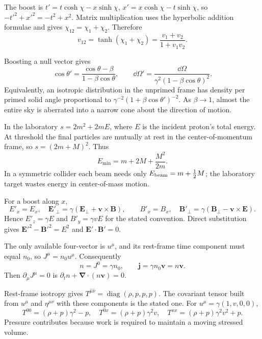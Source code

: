 \begin{solutions}

\begin{solution}
The boost is
\(t'=t\cosh\chi-x\sinh\chi\),
\(x'=x\cosh\chi-t\sinh\chi\), so
\(-t'^2+x'^2=-t^2+x^2\).  Matrix multiplication uses the hyperbolic addition
formulae and gives \(\chi_{12}=\chi_1+\chi_2\).  Therefore
\[
v_{12}=\tanh(\chi_1+\chi_2)
       =\frac{v_1+v_2}{1+v_1v_2}.
\]
\end{solution}

\begin{solution}
Boosting a null vector gives
\[
\cos\theta'=\frac{\cos\theta-\beta}{1-\beta\cos\theta},
\qquad
\dd\Omega'=\frac{\dd\Omega}{\gamma^2(1-\beta\cos\theta)^2}.
\]
Equivalently, an isotropic distribution in the unprimed frame has density per
primed solid angle proportional to
\(\gamma^{-2}(1+\beta\cos\theta')^{-2}\).  As \(\beta\to1\), almost the entire
sky is aberrated into a narrow cone about the direction of motion.
\end{solution}

\begin{solution}
In the laboratory \(s=2m^2+2mE\), where \(E\) is the incident proton's total
energy.  At threshold the final particles are mutually at rest in the
center-of-momentum frame, so \(s=(2m+M)^2\).  Thus
\[
E_{\min}=m+2M+\frac{M^2}{2m}.
\]
In a symmetric collider each beam needs only
\(E_{\rm beam}=m+\tfrac12M\); the laboratory target wastes energy in
center-of-mass motion.
\end{solution}

\begin{solution}
For a boost along \(x\),
\[
E'_x=E_x,\quad
\bm E'_\perp=\gamma(\bm E_\perp+\bm v\times\bm B),\qquad
B'_x=B_x,\quad
\bm B'_\perp=\gamma(\bm B_\perp-\bm v\times\bm E).
\]
Hence \(E'_z=\gamma E\) and \(B'_y=\gamma vE\) for the stated convention.
Direct substitution gives
\(\bm E'^2-\bm B'^2=E^2\) and
\(\bm E'\cdot\bm B'=0\).
\end{solution}

\begin{solution}
The only available four-vector is \(u^\mu\), and its rest-frame time component
must equal \(n_0\), so \(J^\mu=n_0u^\mu\).  Consequently
\[
n=J^0=\gamma n_0,\qquad \bm j=\gamma n_0\bm v=n\bm v.
\]
Then \(\partial_\mu J^\mu=0\) is
\(\partial_t n+\bm\nabla\cdot(n\bm v)=0\).
\end{solution}

\begin{solution}
Rest-frame isotropy gives
\(T^{\hat\mu\hat\nu}=\operatorname{diag}(\rho,p,p,p)\).  The covariant tensor
built from \(u^\mu\) and \(\eta^{\mu\nu}\) with these components is the stated
one.  For \(u^\mu=\gamma(1,v,0,0)\),
\[
T^{00}=(\rho+p)\gamma^2-p,\quad
T^{0x}=(\rho+p)\gamma^2v,\quad
T^{xx}=(\rho+p)\gamma^2v^2+p.
\]
Pressure contributes because work is required to maintain a moving stressed
volume.
\end{solution}


\end{solutions}
